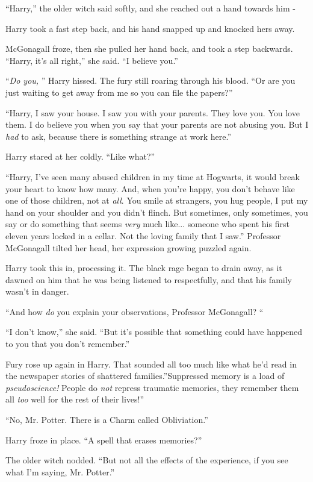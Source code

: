 ``Harry,'' the older witch said softly, and she reached out a hand
towards him -

Harry took a fast step back, and his hand snapped up and knocked hers
away.

McGonagall froze, then she pulled her hand back, and took a step
backwards. ``Harry, it's all right,'' she said. ``I believe you.''

``\emph{Do you,} '' Harry hissed. The fury still roaring through his
blood. ``Or are you just waiting to get away from me so you can file the
papers?''

``Harry, I saw your house. I saw you with your parents. They love you.
You love them. I do believe you when you say that your parents are not
abusing you. But I \emph{had} to ask, because there is something strange
at work here.''

Harry stared at her coldly. ``Like what?''

``Harry, I've seen many abused children in my time at Hogwarts, it would
break your heart to know how many. And, when you're happy, you don't
behave like one of those children, not at \emph{all}. You smile at
strangers, you hug people, I put my hand on your shoulder and you didn't
flinch. But sometimes, only sometimes, you say or do something that
seems \emph{very} much like... someone who spent his first eleven
years locked in a cellar. Not the loving family that I saw.'' Professor
McGonagall tilted her head, her expression growing puzzled again.

Harry took this in, processing it. The black rage began to drain away,
as it dawned on him that he was being listened to respectfully, and that
his family wasn't in danger.

``And how \emph{do} you explain your observations, Professor McGonagall?
``

``I don't know,'' she said. ``But it's possible that something could
have happened to you that you don't remember.''

Fury rose up again in Harry. That sounded all too much like what he'd
read in the newspaper stories of shattered families.''Suppressed memory
is a load of \emph{pseudoscience!} People do \emph{not} repress
traumatic memories, they remember them all \emph{too} well for the rest
of their lives!''

``No, Mr. Potter. There is a Charm called Obliviation.''

Harry froze in place. ``A spell that erases memories?''

The older witch nodded. ``But not all the effects of the experience, if
you see what I'm saying, Mr. Potter.''

